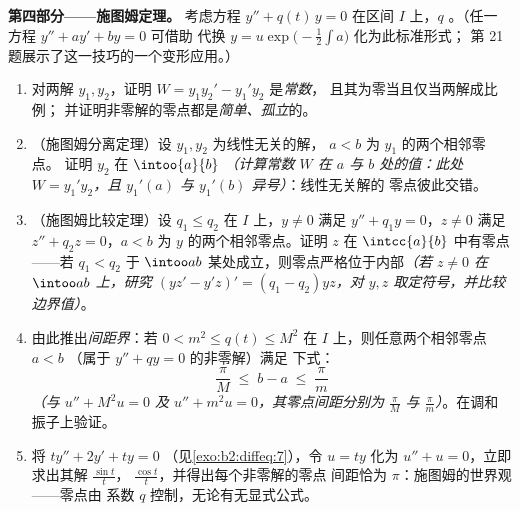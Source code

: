 \begin{problem}
\medskip
\noindent\textbf{第四部分——施图姆定理。} 考虑方程 $y''
+ q(t)\,y = 0$ 在区间 $I$ 上，$q$ 。（任一
方程 $y'' + ay' + by = 0$ 可借助
代换 $y = u\exp\bigl(-\frac12\int a\bigr)$ 化为此标准形式；
第 21 题展示了这一技巧的一个变形应用。）
\begin{enumerate}[resume]
  \item 对两解 $y_1, y_2$，证明
        $W = y_1y_2' - y_1'y_2$ 是\emph{常数}，
        且其为零当且仅当两解成比例；
        并证明非零解的零点都是\emph{简单、孤立}的。
  \item （施图姆分离定理）设 $y_1, y_2$ 为线性无关的解，
        $a < b$ 为 $y_1$ 的两个相邻零点。
        证明 $y_2$ 在
        $\intoo{a}{b}$ \emph{（计算常数 $W$ 在 $a$
        与 $b$ 处的值：此处 $W = y_1'y_2$，且 $y_1'(a)$
        与 $y_1'(b)$ 异号）}：线性无关解的
        零点彼此交错。
  \item （施图姆比较定理）设 $q_1 \leq q_2$ 在 $I$ 上，$y \neq
        0$ 满足 $y'' + q_1y = 0$，$z \neq 0$ 满足 $z'' + q_2z
        = 0$，$a < b$ 为 $y$ 的两个相邻零点。证明
        $z$ 在 $\intcc{a}{b}$ 中有零点——若
        $q_1 < q_2$ 于 $\intoo ab$ 某处成立，则零点严格位于内部\emph{（若 $z \neq
        0$ 在 $\intoo ab$ 上，研究 $(yz' - y'z)' = (q_1 -
        q_2)yz$，对 $y, z$ 取定符号，并比较
        边界值）}。
  \item 由此推出\emph{间距界}：若 $0 < m^2 \leq
        q(t) \leq M^2$ 在 $I$ 上，则任意两个相邻零点
        $a < b$ （属于 $y'' + qy = 0$ 的非零解）满足
        下式：
        \[
        \frac{\pi}{M} \;\leq\; b - a \;\leq\; \frac{\pi}{m}
        \]
        \emph{（与 $u'' + M^2u = 0$ 及 $u'' + m^2u
        = 0$，其零点间距分别为 $\frac\pi M$ 与
        $\frac\pi m$）}。在调和振子上验证。
  \item 将 $ty'' + 2y' + ty = 0$
        （见\cref{exo:b2:diffeq:7}），令 $u = ty$ 化为 $u'' + u =
        0$，立即求出其解 $\frac{\sin t}t$，
        $\frac{\cos t}{t}$，并得出每个非零解的零点
        间距恰为
        $\pi$：施图姆的世界观——零点由
        系数 $q$ 控制，无论有无显式公式。
\end{enumerate}


\end{problem}
